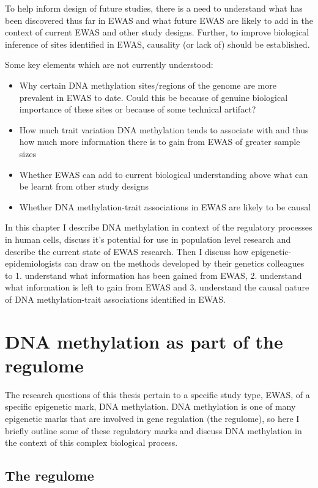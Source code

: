 \documentclass[11pt,twoside]{bristolthesis}
\providecommand{\tightlist}{%
  \setlength{\itemsep}{0pt}\setlength{\parskip}{0pt}}
\begin{document}
To help inform design of future studies, there is a need to understand what has been discovered thus far in EWAS and what future EWAS are likely to add in the context of current EWAS and other study designs. Further, to improve biological inference of sites identified in EWAS, causality (or lack of) should be established.

Some key elements which are not currently understood:
\begin{itemize}
\tightlist
\item
  Why certain DNA methylation sites/regions of the genome are more prevalent in EWAS to date. Could this be because of genuine biological importance of these sites or because of some technical artifact?
\item
  How much trait variation DNA methylation tends to associate with and thus how much more information there is to gain from EWAS of greater sample sizes
\item
  Whether EWAS can add to current biological understanding above what can be learnt from other study designs
\item
  Whether DNA methylation-trait associations in EWAS are likely to be causal
\end{itemize}
In this chapter I describe DNA methylation in context of the regulatory processes in human cells, discuss it's potential for use in population level research and describe the current state of EWAS research. Then I discuss how epigenetic-epidemiologists can draw on the methods developed by their genetics colleagues to 1. understand what information has been gained from EWAS, 2. understand what information is left to gain from EWAS and 3. understand the causal nature of DNA methylation-trait associations identified in EWAS.

\hypertarget{dna-methylation-as-part-of-the-regulome}{%
\section{DNA methylation as part of the regulome}\label{dna-methylation-as-part-of-the-regulome}}

The research questions of this thesis pertain to a specific study type, EWAS, of a specific epigenetic mark, DNA methylation. DNA methylation is one of many epigenetic marks that are involved in gene regulation (the regulome), so here I briefly outline some of these regulatory marks and discuss DNA methylation in the context of this complex biological process.

\hypertarget{the-regulome}{%
\subsection{The regulome}\label{the-regulome}}
\end{document}

